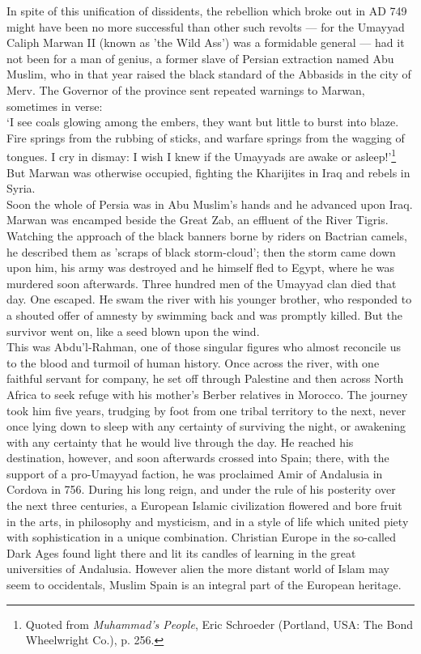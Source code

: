 \documentclass[10pt, twoside,openright]{book}
\begin{document}
In spite of this unification of dissidents, the rebellion which broke out in AD 749 might have been 
no more successful than other such revolts --- for the Umayyad Caliph Marwan II (known as 'the Wild 
Ass') was a formidable general --- had it not been for a man of genius, a former slave of Persian 
extraction named Abu Muslim, who in that year raised the black standard of the Abbasids in the city 
of Merv. The Governor of the province sent repeated warnings to Marwan, sometimes in verse: \\

`I see coals glowing among the embers, they want but little to burst into blaze. Fire springs from the 
rubbing of sticks, and warfare springs from the wagging of tongues. I cry in dismay: I wish I knew if 
the Umayyads are awake or asleep!'\footnote{Quoted from \emph{Muhammad's People}, Eric Schroeder (Portland, USA: The Bond Wheelwright Co.), p. 256.}\\

But Marwan was otherwise occupied, fighting the Kharijites in Iraq and rebels in Syria. \\

Soon the whole of Persia was in Abu Muslim's hands and he advanced upon Iraq. Marwan was encamped 
beside the Great Zab, an effluent of the River Tigris. Watching the approach of the black banners 
borne by riders on Bactrian camels, he described them as 'scraps of black storm-cloud'; then the 
storm came down upon him, his army was destroyed and he himself fled to Egypt, where he was murdered 
soon afterwards. Three hundred men of the Umayyad clan died that day. One escaped. He swam the river 
with his younger brother, who responded to a shouted offer of amnesty by swimming back and was 
promptly killed. But the survivor went on, like a seed blown upon the wind.\\

This was Abdu'l\hyp{}Rahman, one of those singular figures who almost reconcile us to the blood and 
turmoil of human history. Once across the river, with one faithful servant for company, he set off 
through Palestine and then across North Africa to seek refuge with his mother's Berber relatives in 
Morocco. The journey took him five years, trudging by foot from one tribal territory to the next, 
never once lying down to sleep with any certainty of surviving the night, or awakening with any 
certainty that he would live through the day. He reached his destination, however, and soon 
afterwards crossed into Spain; there, with the support of a pro\hyp{}Umayyad faction, he was proclaimed 
Amir of Andalusia in Cordova in 756. During his long reign, and under the rule of his posterity over 
the next three centuries, a European Islamic civilization flowered and bore fruit in the arts, in 
philosophy and mysticism, and in a style of life which united piety with sophistication in a unique 
combination. Christian Europe in the so\hyp{}called Dark Ages found light there and lit its candles of 
learning in the great universities of Andalusia. However alien the more distant world of Islam may 
seem to occidentals, Muslim Spain is an integral part of the European heritage. \\
\end{document}
